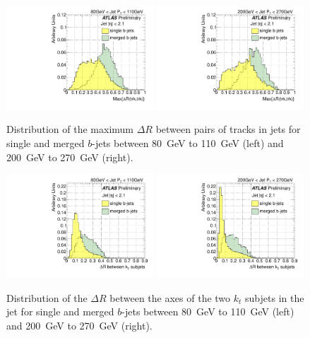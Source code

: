 \begin{figure}[tp]
\centering
\includegraphics[width=0.49\textwidth]{FIGS/VarsSingleMerged/drmax080.pdf}
\includegraphics[width=0.49\textwidth]{FIGS/VarsSingleMerged/drmax200.pdf}
\caption{Distribution of the maximum $\Delta R$ between pairs of tracks in jets for single and merged $b$-jets between 80~GeV to 110~GeV (left) and 200~GeV to 270~GeV (right).}
\label{fig:drmaxsinglemerged}
\end{figure}

\begin{figure}[tp]
\centering
\includegraphics[width=0.49\textwidth]{FIGS/VarsSingleMerged/DRkt2axes080.pdf}
\includegraphics[width=0.49\textwidth]{FIGS/VarsSingleMerged/DRkt2axes200.pdf}
\caption{Distribution of the $\Delta R$ between the axes of the two $k_t$ subjets in the jet for single and merged $b$-jets between 80~GeV to 110~GeV (left) and 200~GeV to 270~GeV (right).}
\label{fig:drktsinglemerged}
\end{figure}


